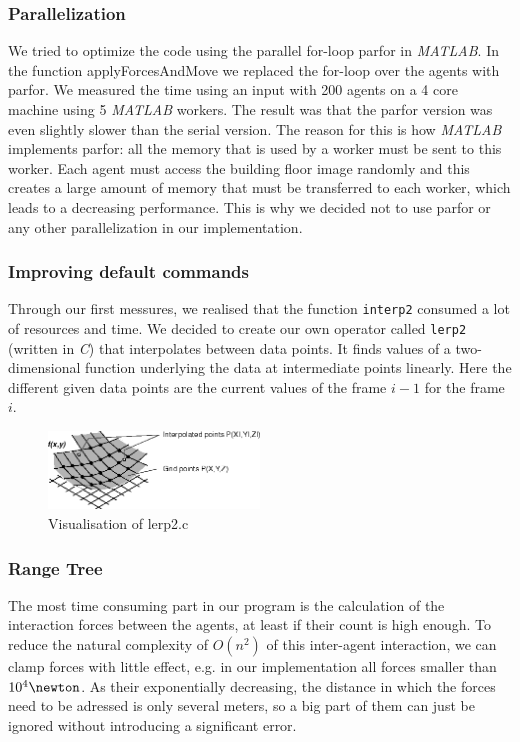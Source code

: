 \documentclass[11pt]{article}
\begin{document}
\subsubsection{Parallelization}

We tried to optimize the code using the parallel for-loop parfor in \textit{MATLAB}. In
the function applyForcesAndMove we replaced the for-loop over the agents with
parfor. We measured the time using an input with 200 agents on a 4 core machine
using 5 \textit{MATLAB} workers. The result was that the parfor version was even slightly
slower than the serial version. The reason for this is how \textit{MATLAB} implements
parfor: all the memory that is used by a worker must be sent to this worker.
Each agent must access the building floor image randomly and this creates a
large amount of memory that must be transferred to each worker, which leads to a
decreasing performance.
This is why we decided not to use parfor or any other parallelization in our
implementation.

\subsubsection{Improving default commands}

Through our first messures, we realised that the function \verb+interp2+
consumed a lot of resources and time. We decided to create our own operator
called \verb+lerp2+ (written in \textit{C}) that interpolates between data points. It finds values of a
two-dimensional function  underlying the data at intermediate points linearly.
Here the different given data points are the current values of the frame $i-1$
for the frame $i$. 

\begin{figure}[h]
\centering
\includegraphics[width=0.5\textwidth]{./images/lerp2.png}
\caption{Visualisation of lerp2.c} 
\label{lerp2 image}
\end{figure}

\subsubsection{Range Tree}
The most time consuming part in our program is the calculation of the interaction
forces between the agents, at least if their count is high enough. To reduce the
natural complexity of $O(n^{2})$ of this inter-agent interaction, we can clamp forces
with little effect, e.g. in our implementation all forces smaller than $ 10^{4}\newton$.
As their exponentially decreasing, the distance in which the forces need to be adressed
is only several meters, so a big part of them can just be ignored without introducing 
a significant error.
\end{document}
